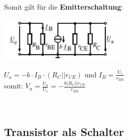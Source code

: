 		Somit gilt für die \textbf{Emitterschaltung}: \\
		\begin{minipage}[c]{6cm}
			\includegraphics[width=6cm]{images/emittersch-esb}
		\end{minipage}
		\begin{minipage}[c]{12cm}
			$U_a = -b \cdot I_B \cdot (R_C || r_{CE})$ und $I_B=\frac{U_e}{r_{BE}}$ \\
			somit: $V_u = \frac{U_a}{U_e} = -\frac{b(R_C || r_{CE}}{r_{BE}}$ 
		\end{minipage} \\
		
	\subsection{Transistor als Schalter}
		